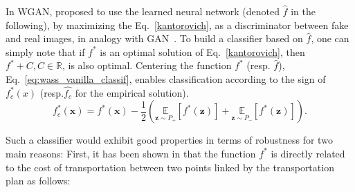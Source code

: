 In WGAN, \cite{Arjovsky2017} proposed to use the learned neural network (denoted $\hat{f}$ in the following),  by maximizing the Eq.~\eqref{kantorovich}, as a discriminator between fake and real images, in analogy with GAN~\cite{Goodfellow2014}.
To build a classifier based on $\hat{f}$, one can simply note that if  $f^*$ is an optimal solution of Eq.~\eqref{kantorovich}, then  $f^* + C, C\in \mathbb{R}$, is also optimal. Centering the function $f^*$ (resp. $\hat{f}$), Eq.~\eqref{eq:wass_vanilla_classif}, enables classification according to the sign of $f_c^*(x)$ (resp.$\hat{f_c}$ for the empirical solution).
\begin{equation}
\label{eq:wass_vanilla_classif}
f_c^*(\textbf{x} )=f^*(\textbf{x} )-\frac{1}{2}\left(\underset{\textbf{z}  \sim P_+}{\mathbb{E}} \left[f^*(\textbf{z} )\right] +\underset{\textbf{z}  \sim P_-}{\mathbb{E}} \left[f^*(\textbf{z} )\right]\right).
\end{equation}

Such a classifier would exhibit good properties in terms of robustness for two main reasons: First, it has been shown in \cite{villani2008} that the function $f^*$ is directly related to the cost of transportation between two points linked by the transportation plan %
as follows:


